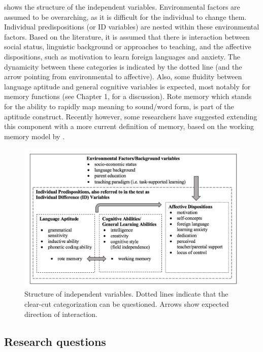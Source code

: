 \documentclass[output=paper]{langsci/langscibook}
\begin{document}
 shows the structure of the independent variables. Environmental factors are assumed to be overarching, as it is difficult for the individual to change them. Individual predispositions (or ID variables) are nested within these environmental factors. Based on the literature, it is assumed that there is interaction between social status, linguistic background or approaches to teaching, and the affective dispositions, such as motivation to learn foreign languages and anxiety. The dynamicity between these categories is indicated by the dotted line (and the arrow pointing from environmental to affective). Also, some fluidity between language aptitude and general cognitive variables is expected, most notably for memory functions (see Chapter 1,  for a discussion). Rote memory which stands for the ability to rapidly map meaning to sound/word form, is part of the aptitude construct. Recently however, some researchers have suggested extending this component with a more current definition of memory, based on the working memory model by \citet{BaddeleyHitch1974}. 

\begin{figure}
\includegraphics[width=\textwidth]{figures/intro-fig1.png}
\caption{Structure of independent variables. Dotted lines indicate that the clear-cut categorization can be questioned. Arrows show expected direction of interaction.\label{fig:intro:1}}
\end{figure}

\subsection{Research questions}\label{sec:intro:4.2}
\end{document}
